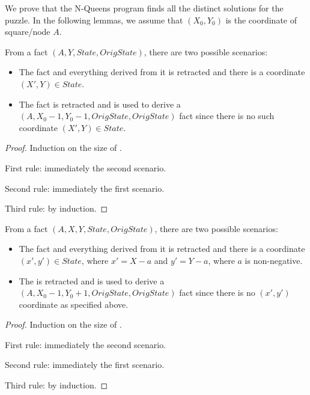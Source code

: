 We prove that the N-Queens program finds all the distinct solutions for the
puzzle. In the following lemmas, we assume that $(X_0, Y_0)$ is the coordinate
of square/node $A$.

\begin{lemma}

From a fact $(A, Y, State, OrigState)$, there are two possible
scenarios:

\begin{itemize}
   \item The  fact and everything derived from it is retracted and
      there is a coordinate $(X', Y) \in State$.
   \item The  fact is retracted and is used to derive a
      $(A, X_0 - 1, Y_0 - 1,
      OrigState, OrigState)$ fact since 
      there is no such coordinate $(X', Y) \in State$.
\end{itemize}

\end{lemma}
\begin{proof}
Induction on the size of .

First rule: immediately the second scenario.

Second rule: immediately the first scenario.

Third rule: by induction.
\end{proof}

\begin{lemma}
   From a fact $(A, X, Y, State, OrigState)$, there are
  two possible scenarios:
   
  \begin{itemize}
     \item The  fact and everything derived from it is
        retracted and there is a coordinate $(x', y') \in State$, where $x' = X
        - a$ and $y' = Y - a$, where $a$ is non-negative.
     \item The  is retracted and is used to derive a
        $(A, X_0 - 1, Y_0 + 1, OrigState, OrigState)$
        fact since there is no $(x', y')$ coordinate as specified above.
  \end{itemize}
\end{lemma}
\begin{proof}
Induction on the size of .

First rule: immediately the second scenario.

Second rule: immediately the first scenario.

Third rule: by induction.
\end{proof}

